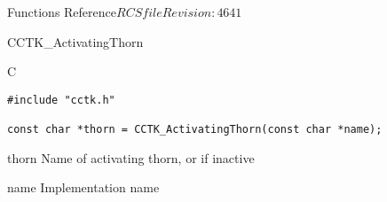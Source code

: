 \begin{cactuspart}{ Functions Reference}{$RCSfile$}{$Revision: 4641 $}
\begin{FunctionDescription}{CCTK\_ActivatingThorn}
\begin{SynopsisSection}
\begin{Synopsis}{C}
\begin{verbatim}
#include "cctk.h"

const char *thorn = CCTK_ActivatingThorn(const char *name);
\end{verbatim}
\end{Synopsis}
\end{SynopsisSection}

\begin{ResultSection}
\begin{Result}{thorn}
Name of activating thorn, or  if inactive
\end{Result}
\end{ResultSection}

\begin{ParameterSection}
\begin{Parameter}{name}
Implementation name
\end{Parameter}
\end{ParameterSection}


\end{FunctionDescription}
\end{cactuspart}
